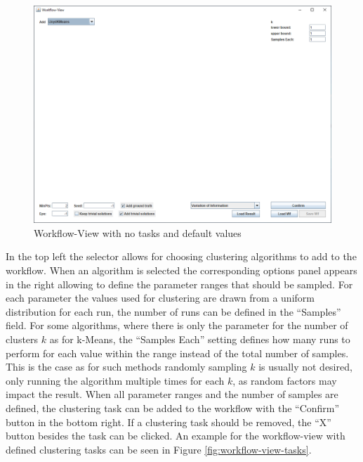\documentclass[
	a4paper,
	english,
	twoside,
	openright,               
	11pt                            
	]{report}
\begin{document}
\begin{figure}[h]
	\centering
	\includegraphics[scale=.43]{workflow-view}
	\caption{Workflow-View with no tasks and default values}
	\label{fig:workflow-view}
\end{figure}

In the top left the selector allows for choosing clustering algorithms to add to the workflow. When an algorithm is selected the corresponding options panel appears in the right allowing to define the parameter ranges that should be sampled. For each parameter the values used for clustering are drawn from a uniform distribution for each run, the number of runs can be defined in the ``Samples'' field. For some algorithms, where there is only the parameter for the number of clusters $k$ as for k-Means, the ``Samples Each'' setting defines how many runs to perform for each value within the range instead of the total number of samples. This is the case as for such methods randomly sampling $k$ is usually not desired, only running the algorithm multiple times for each $k$, as random factors may impact the result. When all parameter ranges and the number of samples are defined, the clustering task can be added to the workflow with the ``Confirm'' button in the bottom right. If a clustering task should be removed, the ``X'' button besides the task can be clicked. An example for the workflow-view with defined clustering tasks can be seen in Figure \ref{fig:workflow-view-tasks}.
\end{document}
